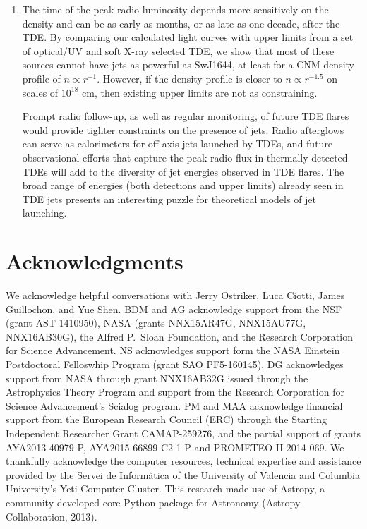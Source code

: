 \documentclass[usenatbib,fleqn]{mnras}
\begin{document}
\begin{enumerate}
\item The time of the peak radio luminosity depends more sensitively
  on the density and can be as early as months, or as late as one
  decade, after the TDE. By comparing our calculated light curves with
  upper limits from a set of optical/UV and soft X-ray selected TDE, we
  show that most of these sources cannot have jets as powerful as
  SwJ1644, at least for a CNM density profile of $n\propto r^{-1}$.
  However, if the density profile is closer to $n\propto r^{-1.5}$ on
  scales of $10^{18}$ cm, then existing upper limits are not as
  constraining.

  Prompt radio follow-up, as well as regular monitoring, of future TDE
  flares would provide tighter constraints on the presence of jets.
  Radio afterglows can serve as calorimeters for off-axis jets
  launched by TDEs, and future observational efforts that capture the
  peak radio flux in thermally detected TDEs will add to the diversity
  of jet energies observed in TDE flares.  The broad range of energies
  (both detections and upper limits) already seen in TDE jets presents
  an interesting puzzle for theoretical models of jet launching.
\end{enumerate}


\section*{Acknowledgments}
We acknowledge helpful conversations with Jerry Ostriker, Luca Ciotti,
James Guillochon, and Yue Shen. BDM and AG acknowledge support from
the NSF (grant AST-1410950), NASA (grants NNX15AR47G, NNX15AU77G,
NNX16AB30G), the Alfred P.~Sloan Foundation, and the Research
Corporation for Science Advancement.  NS acknowledges support form the
NASA Einstein Postdoctoral Felloswhip Program (grant SAO
PF5-160145). DG acknowledges support from NASA through grant
NNX16AB32G issued through the Astrophysics Theory Program and support
from the Research Corporation for Science Advancement’s Scialog
program.  PM and MAA acknowledge financial support from the European
Research Council (ERC) through the Starting Independent Researcher
Grant CAMAP-259276, and the partial support of grants AYA2013-40979-P,
AYA2015-66899-C2-1-P and PROMETEO-II-2014-069. We thankfully
acknowledge the computer resources, technical expertise and assistance
provided by the Servei de Inform\`atica of the University of Valencia
and Columbia University's Yeti Computer Cluster. This research made
use of Astropy, a community-developed core Python package for
Astronomy (Astropy Collaboration, 2013).
\end{document}
